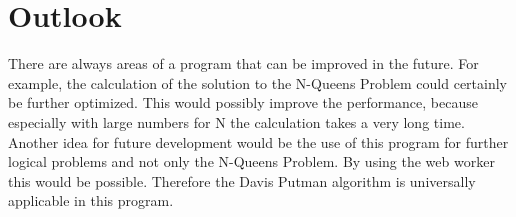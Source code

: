 \section{Outlook} 
There are always areas of a program that can be improved in the future. For example, the calculation of the solution to the N-Queens Problem could certainly be further optimized. This would possibly improve the performance, because especially with large numbers for N the calculation takes a very long time. 
\\
Another idea for future development would be the use of this program for further logical problems and not only the N-Queens Problem. By using the web worker this would be possible. Therefore the Davis Putman algorithm is universally applicable in this program.
